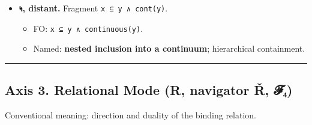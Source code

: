 \documentclass[12pt,a4paper]{article}
\begin{document}
\begin{itemize}
  \begin{itemize}
  \tightlist
  \item
    FO: \texttt{graph(x)\ ∧\ (∃v)\ deg(v)\ ≥\ 3}.
  \item
    Named: a \textbf{branching graph / tree with vertices of degree ≥
    3}.
  \end{itemize}
\item
  \textbf{𐑰, distant.} Fragment \texttt{x\ ⊆\ y\ ∧\ cont(y)}.

  \begin{itemize}
  \tightlist
  \item
    FO: \texttt{x\ ⊆\ y\ ∧\ continuous(y)}.
  \item
    Named: \textbf{nested inclusion into a continuum}; hierarchical
    containment.
  \end{itemize}
\end{itemize}

\begin{center}\rule{0.5\linewidth}{0.5pt}\end{center}

\hypertarget{axis-3.-relational-mode-r-navigator-ux159-ux1d4d5ux2084}{%
\subsection{Axis 3. Relational Mode (R, navigator Ř,
𝓕₄)}\label{axis-3.-relational-mode-r-navigator-ux159-ux1d4d5ux2084}}

Conventional meaning: direction and duality of the binding relation.
\end{document}
